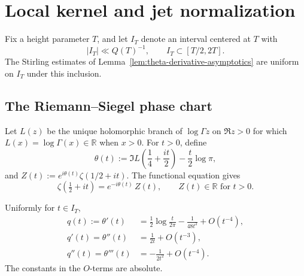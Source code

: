 \section{Local kernel and jet normalization}
\label{sec:local-kernel-and-jet-normalization}
\quad
{}\quad
{}\quad
{}\quad
{}\quad
{}
\par\medskip

Fix a height parameter \(T\), and let \(I_T\) denote an interval
centered at \(T\) with
\[
        |I_T|\ll Q(T)^{-1},
        \qquad I_T\subset [T/2,2T].
\]
The Stirling estimates of
Lemma~\ref{lem:theta-derivative-asymptotics} are uniform on \(I_T\)
under this inclusion.

\subsection{The Riemann--Siegel phase chart}
\label{subsec:local-phase-chart}

\begin{definition}
\label{def:riemann-siegel-phase}
Let \(L(z)\) be the unique holomorphic branch of \(\log\Gamma z\) on
\(\Re z>0\) for which \(L(x)=\log\Gamma(x)\in\mathbb R\) when \(x>0\).
For \(t>0\), define
\begin{equation}
\label{eq:theta-definition}
 \theta(t)
 := \Im L\!\left(\frac14+\frac{it}{2}\right)
    -\frac{t}{2}\log\pi,
\end{equation}
and \(Z(t):=e^{i\theta(t)}\zeta(1/2+it)\).  The functional equation
gives
\[
        \zeta\!\left(\tfrac12+it\right)
        =e^{-i\theta(t)}\,Z(t),
        \qquad Z(t)\in\mathbb R \text{ for } t>0.
\]
\end{definition}

\begin{lemma}
\label{lem:theta-derivative-asymptotics}
Uniformly for \(t\in I_T\),
\begin{align}
\label{eq:theta-derivative-asymptotics}
q(t):=\theta'(t)
&=\frac12\log\frac{t}{2\pi}-\frac{1}{48 t^2}+O(t^{-4}),\\
q'(t)=\theta''(t)
&=\frac{1}{2t}+O(t^{-3}),\\
q''(t)=\theta'''(t)
&=-\frac{1}{2t^2}+O(t^{-4}).
\end{align}
The constants in the \(O\)-terms are absolute.
\end{lemma}

